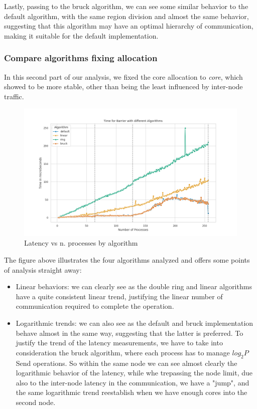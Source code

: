 \documentclass{article}
\begin{document}
	Lastly, passing to the bruck algorithm, we can see some similar behavior to the default algorithm, with the same region division and almost the same behavior, suggesting that this algorithm may have an optimal hierarchy of communication, making it suitable for the default implementation.
	
	
	\subsubsection{Compare algorithms fixing allocation}
	
	In this second part of our analysis, we fixed the core allocation to \textit{core}, which showed to be more stable, other than being the least influenced by inter-node traffic.
	
	
	\begin{figure}[h]
		\centering
		\includegraphics[width=0.7\linewidth]{../exercise1/plots/barrier_core}
		\caption{Latency vs n. processes by algorithm}
		\label{fig:barriercore}
	\end{figure}
	
	The figure above illustrates the four algorithms analyzed and offers some points of analysis straight away:
	
	\begin{itemize}
		\item Linear behaviors: we can clearly see as the double ring and linear algorithms have a quite consistent linear trend, justifying the linear number of communication required to complete the operation.
		\item Logarithmic trends: we can also see as the default and bruck implementation behave almost in the same way, suggesting that the latter is preferred. To justify the trend of the latency measurements, we have to take into consideration the bruck algorithm, where each process has to manage $log_2P$ Send operations. So within the same node we can see almost clearly the logarithmic behavior of the latency, while whe trepassing the node limit, due also to the inter-node latency in the communication, we have a "jump", and the same logarithmic trend reestablish when we have enough cores into the second node.
	\end{itemize}
	
\end{document}
